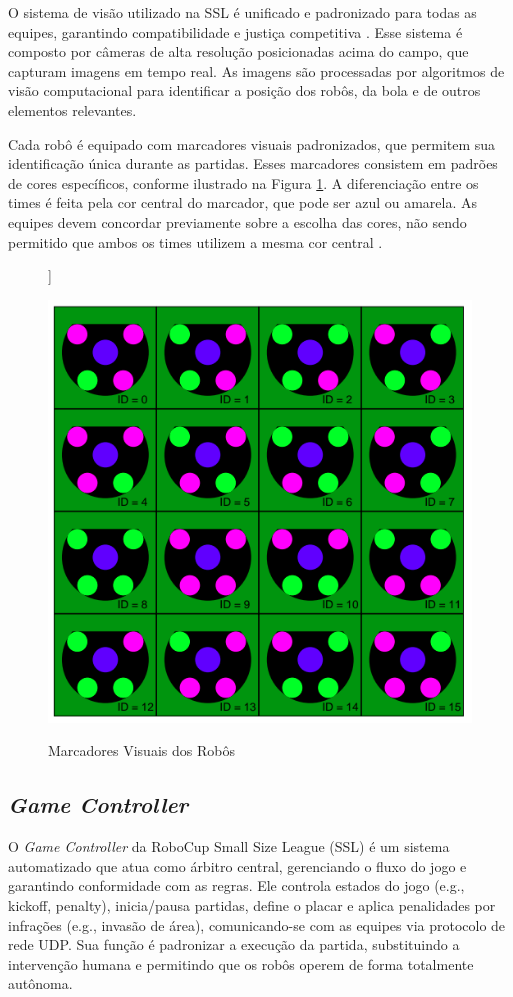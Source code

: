 O sistema de visão utilizado na SSL é unificado e padronizado para todas as equipes, garantindo compatibilidade e justiça competitiva \cite{zickler2009shared}. Esse sistema é composto por câmeras de alta resolução posicionadas acima do campo, que capturam imagens em tempo real. As imagens são processadas por algoritmos de visão computacional para identificar a posição dos robôs, da bola e de outros elementos relevantes.

Cada robô é equipado com marcadores visuais padronizados, que permitem sua identificação única durante as partidas. Esses marcadores consistem em padrões de cores específicos, conforme ilustrado na Figura \ref{fig:cores_robos}. A diferenciação entre os times é feita pela cor central do marcador, que pode ser azul ou amarela. As equipes devem concordar previamente sobre a escolha das cores, não sendo permitido que ambos os times utilizem a mesma cor central \cite{robocup2023rules}.

\begin{figure}
    \centering]
    \caption{Marcadores Visuais dos Robôs}
    \includegraphics[width=0.5\linewidth]{figuras/cores_robos.png}
    \label{fig:cores_robos}
\end{figure}


\subsection{\textit{Game Controller}}  
O \textit{Game Controller} da RoboCup Small Size League (SSL) é um sistema automatizado que atua como árbitro central, gerenciando o fluxo do jogo e garantindo conformidade com as regras. Ele controla estados do jogo (e.g., kickoff, penalty), inicia/pausa partidas, define o placar e aplica penalidades por infrações (e.g., invasão de área), comunicando-se com as equipes via protocolo de rede UDP. Sua função é padronizar a execução da partida, substituindo a intervenção humana e permitindo que os robôs operem de forma totalmente autônoma.  


